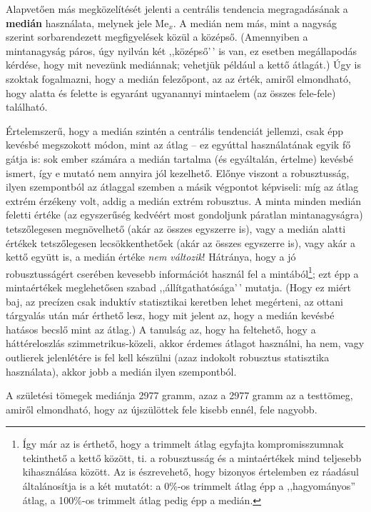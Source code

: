 \documentclass[
]{book}
\begin{document}
Alapvetően más megközelítését jelenti a centrális tendencia megragadásának a \textbf{medián} használata, melynek jele \(\mathrm{Me}_x\). A medián nem más, mint a nagyság szerint sorbarendezett megfigyelések közül a középső. (Amennyiben a mintanagyság páros, úgy nyilván két ,,középső'\,' is van, ez esetben megállapodás kérdése, hogy mit nevezünk mediánnak; vehetjük például a kettő átlagát.) Úgy is szoktak fogalmazni, hogy a medián felezőpont, az az érték, amiről elmondható, hogy alatta és felette is egyaránt ugyanannyi mintaelem (az összes fele-fele) található.

Értelemszerű, hogy a medián szintén a centrális tendenciát jellemzi, csak épp kevésbé megszokott módon, mint az átlag -- ez egyúttal használatának egyik fő gátja is: sok ember számára a medián tartalma (és egyáltalán, értelme) kevésbé ismert, így e mutató nem annyira jól kezelhető. Előnye viszont a robusztusság, ilyen szempontból az átlaggal szemben a másik végpontot képviseli: míg az átlag extrém érzékeny volt, addig a medián extrém robusztus. A minta minden medián feletti értéke (az egyszerűség kedvéért most gondoljunk páratlan mintanagyságra) tetszőlegesen megnövelhető (akár az összes egyszerre is), vagy a medián alatti értékek tetszőlegesen lecsökkenthetőek (akár az összes egyszerre is), vagy akár a kettő együtt is, a medián értéke \emph{nem változik}! Hátránya, hogy a jó robusztusságért cserében kevesebb információt használ fel a mintából\footnote{Így már az is érthető, hogy a trimmelt átlag egyfajta kompromisszumnak tekinthető a kettő között, ti. a robusztusság és a mintaértékek mind teljesebb kihasználása között. Az is észrevehető, hogy bizonyos értelemben ez ráadásul általánosítja is a két mutatót: a 0\%-os trimmelt átlag épp a ,,hagyományos'' átlag, a 100\%-os trimmelt átlag pedig épp a medián.}; ezt épp a mintaértékek meglehetősen szabad ,,állítgathatósága'\,' mutatja. (Hogy ez miért baj, az precízen csak induktív statisztikai keretben lehet megérteni, az ottani tárgyalás után már érthető lesz, hogy mit jelent az, hogy a medián kevésbé hatásos becslő mint az átlag.) A tanulság az, hogy ha feltehető, hogy a háttéreloszlás szimmetrikus-közeli, akkor érdemes átlagot használni, ha nem, vagy outlierek jelenlétére is fel kell készülni (azaz indokolt robusztus statisztika használata), akkor jobb a medián ilyen szempontból.

A születési tömegek mediánja 2977 gramm, azaz a 2977 gramm az a testtömeg, amiről elmondható, hogy az újszülöttek fele kisebb ennél, fele nagyobb.
\end{document}
